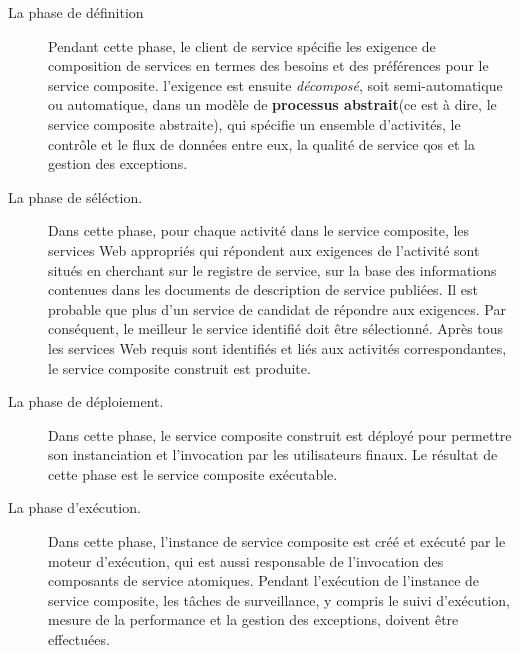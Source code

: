     
    \SpecialItem
    \begin{description}
    \item[La phase de définition] Pendant cette phase, le client de
      service spécifie les exigence de composition de services en
      termes des besoins et des préférences pour le service
      composite. l'exigence est ensuite \textit{décomposé}, soit
      semi-automatique ou automatique, dans un modèle de
      \textbf{processus abstrait}(ce est à dire, le service composite
      abstraite), qui spécifie un ensemble d'activités, le contrôle et
      le flux de données entre eux, la qualité de service
      \acrshort{qos} et la gestion des exceptions.

    \item[La phase de séléction.] Dans cette phase, pour chaque
      activité dans le service composite, les services Web appropriés
      qui répondent aux exigences de l'activité sont situés en
      cherchant sur le registre de service, sur la base des
      informations contenues dans les documents de description de
      service publiées. Il est probable que plus d'un service de
      candidat de répondre aux exigences. Par conséquent, le meilleur
      le service identifié doit être sélectionné. Après tous les
      services Web requis sont identifiés et liés aux activités
      correspondantes, le service composite construit est produite.

    \item[La phase de déploiement.]Dans cette phase, le service
      composite construit est déployé pour permettre son
      instanciation et l'invocation par les utilisateurs finaux. Le
      résultat de cette phase est le service composite exécutable.

    \item[La phase d'exécution.] Dans cette phase, l'instance de
      service composite est créé et exécuté par le moteur
      d'exécution, qui est aussi responsable de l'invocation des
      composants de service atomiques. Pendant l'exécution de
      l'instance de service composite, les tâches de surveillance, y
      compris le suivi d'exécution, mesure de la performance et la
      gestion des exceptions, doivent être effectuées.
    \end{description}
